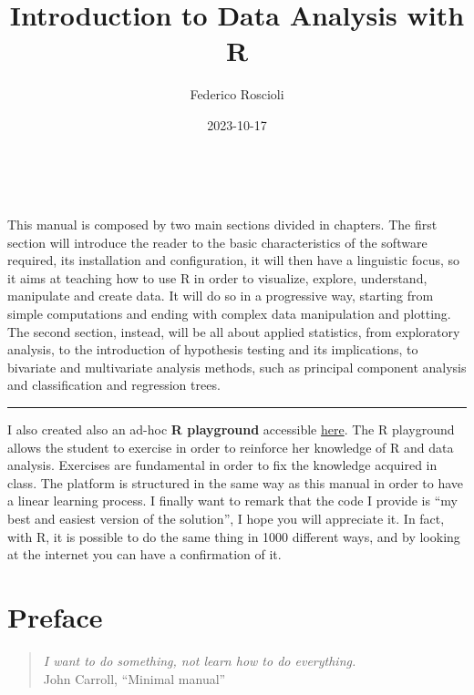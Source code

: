 \documentclass[
]{article}
\title{Introduction to Data Analysis with R}
\author{Federico Roscioli}
\date{2023-10-17}
\begin{document}
\maketitle

\newpage{}

{
\hypersetup{linkcolor=}
\setcounter{tocdepth}{3}
\tableofcontents
}
\pagebreak

~
\pagebreak

This manual is composed by two main sections divided in chapters. The
first section will introduce the reader to the basic characteristics of
the software required, its installation and configuration, it will then
have a linguistic focus, so it aims at teaching how to use R in order to
visualize, explore, understand, manipulate and create data. It will do
so in a progressive way, starting from simple computations and ending
with complex data manipulation and plotting. The second section,
instead, will be all about applied statistics, from exploratory
analysis, to the introduction of hypothesis testing and its
implications, to bivariate and multivariate analysis methods, such as
principal component analysis and classification and regression trees.

\begin{center}\rule{0.5\linewidth}{0.5pt}\end{center}

I also created also an ad-hoc \textbf{R playground} accessible
\href{https://federicoroscioli.shinyapps.io/exercises/}{here}. The R
playground allows the student to exercise in order to reinforce her
knowledge of R and data analysis. Exercises are fundamental in order to
fix the knowledge acquired in class. The platform is structured in the
same way as this manual in order to have a linear learning process. I
finally want to remark that the code I provide is ``my best and easiest
version of the solution'', I hope you will appreciate it. In fact, with
R, it is possible to do the same thing in 1000 different ways, and by
looking at the internet you can have a confirmation of it.
~
~
~
\newpage

\hypertarget{preface}{%
\section*{Preface}\label{preface}}

\justifying

\begin{quote}
\emph{I want to do something, not learn how to do everything.}\\
John Carroll, ``Minimal manual''
\end{quote}
\end{document}
